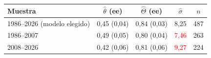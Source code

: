 \begin{tabular}{lcccc}
\toprule
Muestra & $\hat\theta$ (ee) & $\hat\Theta$ (ee) & $\hat\sigma$ & $n$
\\ \midrule
1986--2026 (modelo elegido) & 0{,}45 (0{,}04) & 0{,}84 (0{,}03) & 8{,}25 & 487 \\
1986--2007 & 0{,}49 (0{,}05) & 0{,}80 (0{,}04) & \textcolor{red}{7{,}46} & 263 \\
2008--2026 & 0{,}42 (0{,}06) & 0{,}81 (0{,}06) & \textcolor{red}{9{,}27} & 224 \\
\bottomrule
\end{tabular}
